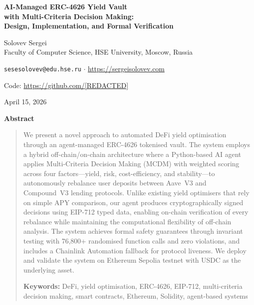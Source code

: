 \documentclass[12pt]{article}
\begin{document}
\begin{center}
  {\LARGE\bfseries AI-Managed ERC-4626 Yield Vault\\[4pt]
   with Multi-Criteria Decision Making:\\[4pt]
   Design, Implementation, and Formal Verification}

  \bigskip

  Solovev Sergei\\
  Faculty of Computer Science, HSE University, Moscow, Russia

  \medskip

  \texttt{sesesolovev@edu.hse.ru}
  \quad$\cdot$\quad
  \url{https://sergeisolovev.com}

  \smallskip

  Code: \url{https://github.com/[REDACTED]}

  \medskip

  April 15, 2026
\end{center}

\bigskip

\begin{center}
  \textbf{Abstract}
\end{center}
\begin{quote}
We present a novel approach to automated DeFi yield optimisation through an agent-managed ERC-4626 tokenised vault.
The system employs a hybrid off-chain/on-chain architecture where a Python-based AI agent applies Multi-Criteria Decision Making (MCDM) with weighted scoring across four factors---yield, risk, cost-efficiency, and stability---to autonomously rebalance user deposits between Aave~V3 and Compound~V3 lending protocols.
Unlike existing yield optimisers that rely on simple APY comparison, our agent produces cryptographically signed decisions using EIP-712 typed data, enabling on-chain verification of every rebalance while maintaining the computational flexibility of off-chain analysis.
The system achieves formal safety guarantees through invariant testing with 76{,}800+ randomised function calls and zero violations, and includes a Chainlink Automation fallback for protocol liveness.
We deploy and validate the system on Ethereum Sepolia testnet with USDC as the underlying asset.

\medskip
\noindent\textbf{Keywords:} DeFi, yield optimisation, ERC-4626, EIP-712, multi-criteria decision making, smart contracts, Ethereum, Solidity, agent-based systems
\end{quote}

\end{document}
